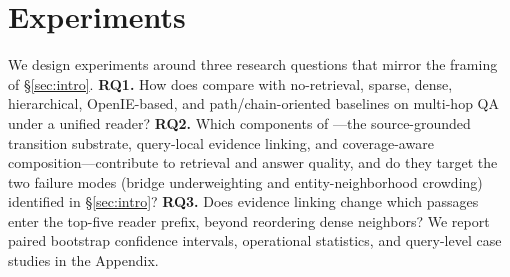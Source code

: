 %
%
%

\providecommand{\tbd}{\textit{---}}

\section{Experiments}
\label{sec:experiments}

We design experiments around three research questions that mirror the
framing of \S\ref{sec:intro}. \textbf{RQ1.} How does \methodname{}
compare with no-retrieval, sparse, dense, hierarchical, OpenIE-based,
and path/chain-oriented baselines on multi-hop QA under a unified reader?
\textbf{RQ2.} Which components of \methodname{}---the source-grounded
transition substrate, query-local evidence linking, and
coverage-aware composition---contribute to retrieval and answer quality,
and do they target the two failure modes (bridge underweighting and
entity-neighborhood crowding) identified in \S\ref{sec:intro}?
\textbf{RQ3.} Does evidence linking change which passages enter the
top-five reader prefix, beyond reordering dense neighbors? We report
paired bootstrap confidence intervals, operational statistics, and
query-level case studies in the Appendix.

